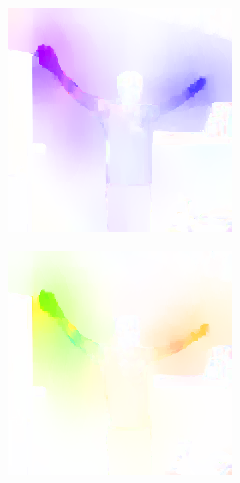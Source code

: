 \begin{figure}[!ht]
\begin{subfigure}[b]{0.24\textwidth}
    \end{subfigure}
    \begin{subfigure}[b]{0.244\textwidth}
        \includegraphics[width=\linewidth]{figures/optical_flow/flow000000312.png}
        \caption{}
        \label{fig:optical-flow-a}
    \end{subfigure}
    \begin{subfigure}[b]{0.244\textwidth}
        \includegraphics[width=\linewidth]{figures/optical_flow/flow000000386.png}

\end{subfigure}
\end{figure}
